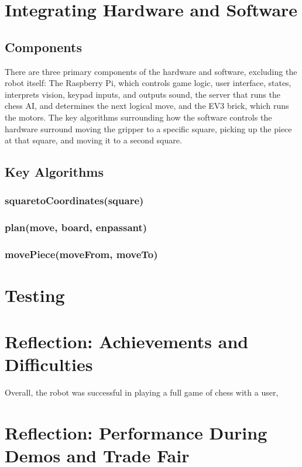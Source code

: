 \documentclass[onecolumn]{IEEEtran}
\begin{document}
\section{Integrating Hardware and Software}
\subsection{Components}
There are three primary components of the hardware and software, excluding the robot itself: The Raspberry Pi, which controls game logic, user interface, states, interprets vision, keypad inputs, and outputs sound, the server that runs the chess AI, and determines the next logical move, and the EV3 brick, which runs the motors. The key algorithms surrounding how the software controls the hardware surround moving the gripper to a specific square, picking up the piece at that square, and moving it to a second square. 
\subsection{Key Algorithms}
\subsubsection{squaretoCoordinates(square)}
\subsubsection{plan(move, board, enpassant)}
\subsubsection{movePiece(moveFrom, moveTo)}
\section{Testing}
\section{Reflection: Achievements and Difficulties}
Overall, the robot was successful in playing a full game of chess with a user, 
\section{Reflection: Performance During Demos and Trade Fair}
\end{document}
